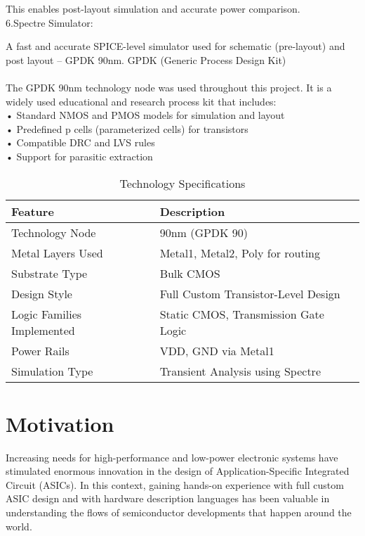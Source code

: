 \documentclass[12pt]{article}
\begin{document}
This enables post-layout simulation and accurate power comparison.
\\
6.Spectre Simulator:

A fast and accurate SPICE-level simulator used for schematic (pre-layout) and   post layout – GPDK 90nm. GPDK (Generic Process Design Kit)\\
\\ 
The GPDK 90nm technology node was used throughout this project. It is a widely used educational and research process kit that includes:\\
•	Standard NMOS and PMOS models for simulation and layout\\
•	Predefined p cells (parameterized cells) for transistors\\
•	Compatible DRC and LVS rules\\
•	Support for parasitic extraction\\

\begin{table}[h!]
\centering
\caption{Technology Specifications}
\begin{tabular}{|l|l|}
\hline
\textbf{Feature} & \textbf{Description} \\
\hline
Technology Node & 90nm (GPDK 90) \\
\hline
Metal Layers Used & Metal1, Metal2, Poly for routing \\
\hline
Substrate Type & Bulk CMOS \\
\hline
Design Style & Full Custom Transistor-Level Design \\
\hline
Logic Families Implemented & Static CMOS, Transmission Gate Logic \\
\hline
Power Rails & VDD, GND via Metal1 \\
\hline
Simulation Type & Transient Analysis using Spectre \\
\hline
\end{tabular}
\end{table}


\section{Motivation}
  Increasing needs for high-performance and low-power electronic systems have stimulated enormous innovation in the design of Application-Specific Integrated Circuit (ASICs). In this context, gaining hands-on experience with full custom ASIC design and with hardware description languages has been valuable in understanding the flows of semiconductor developments that happen around the world.
\end{document}
